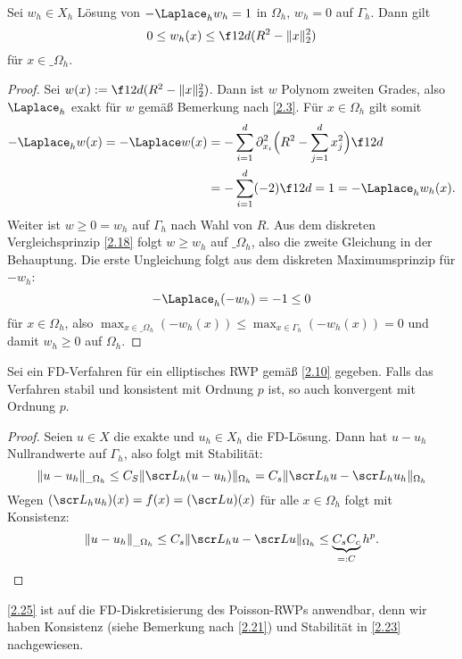 \begin{lem} \label{2.24}
	Sei $w_h \in X_h$ Lösung von $-\Laplace_h w_h = 1$ in $\Omega_h$, $w_h = 0$ auf $\Gamma_h$.
	Dann gilt
	\begin{equation} \label{eq:2.6}
		0 \le w_h(x) \le \f 1{2d} (R^2 - \|x\|_2^2)
	\end{equation}
	für $x \in \_\Omega_h$.
	\begin{proof}
		Sei $w(x) := \f 1{2d} (R^2 - \|x\|_2^2)$.
		Dann ist $w$ Polynom zweiten Grades, also $\Laplace_h$ exakt für $w$ gemäß Bemerkung nach \ref{2.3}.
		Für $x \in \Omega_h$ gilt somit
		\begin{align*}
			-\Laplace_h w(x)
			= - \Laplace w(x)
			&= - \sum_{i=1}^d \partial_{x_i}^2 \Big(R^2 - \sum_{j=1}^d x_j^2 \Big) \f 1{2d} \\
			&= - \sum_{i=1}^d (-2) \f 1{2d}
			= 1
			= - \Laplace_h w_h(x).
		\end{align*}
		Weiter ist $w \ge 0 = w_h$ auf $\Gamma_h$ nach Wahl von $R$.
		Aus dem diskreten Vergleichsprinzip \ref{2.18} folgt $w \ge w_h$ auf $\_\Omega_h$, also die zweite Gleichung in der Behauptung.
		Die erste Ungleichung folgt aus dem diskreten Maximumsprinzip für $-w_h$:
		\[
			- \Laplace_h (-w_h) =  -1 \le 0
		\]
		für $x \in \Omega_h$, also $\max_{x\in\_\Omega_h} (-w_h(x)) \le \max_{x\in \Gamma_h} (-w_h(x)) = 0$ und damit $w_h \ge 0$ auf $\Omega_h$.
	\end{proof}
\end{lem}


\begin{st}[Konvergenz] \label{2.25}
	Sei ein FD-Verfahren für ein elliptisches RWP gemäß \ref{2.10} gegeben.
	Falls das Verfahren stabil und konsistent mit Ordnung $p$ ist, so auch konvergent mit Ordnung $p$.
	\begin{proof}
		Seien $u \in X$ die exakte und $u_h \in X_h$ die FD-Lösung.
		Dann hat $u - u_h$ Nullrandwerte auf $\Gamma_h$, also folgt mit Stabilität:
		\[
			\|u-u_h\|_{\_\Omega_h}
			\le C_S \| \scr L_h (u-u_h) \|_{\Omega_h}
			= C_s \|\scr L_h u - \scr L_h u_h\|_{\Omega_h}
		\]
		Wegen $(\scr L_h u_h)(x) = f(x) = (\scr L u)(x)$ für alle $x \in \Omega_h$ folgt mit Konsistenz:
		\[
			\|u - u_h\|_{\_\Omega_h}
			\le C_s \|\scr L_h u - \scr L u\|_{\Omega_h}
			\le \underbrace{C_s C_c}_{=:C} h^p.
		\]
	\end{proof}
\end{st}

\ref{2.25} ist auf die FD-Diskretisierung des Poisson-RWPs anwendbar, denn wir haben Konsistenz (siehe Bemerkung nach \ref{2.21}) und Stabilität in \ref{2.23} nachgewiesen.

